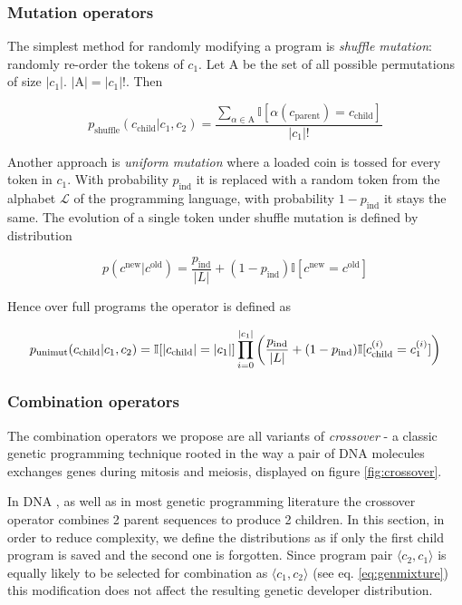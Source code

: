 \subsubsection{Mutation operators}

The simplest method for randomly modifying a program is \emph{shuffle mutation}: randomly re-order the tokens of $c_1$.
Let $\mathrm{A}$ be the set of all possible permutations of size $|c_1|$. $|\mathrm{A}|=|c_1|!$. 
Then

\begin{equation}
    p_\text{shuffle}(c_\text{child}|c_1,c_2) =
            \frac{\sum\limits_{\alpha \in \mathrm{A}} \mathbb{I}[\alpha(c_\text{parent}) = c_\text{child}]}{|c_1|!}
\end{equation}

Another approach is \emph{uniform mutation} where a loaded coin is tossed for every token in $c_1$. 
With probability $p_\text{ind}$ it is replaced with a random token from the alphabet $\mathcal{L}$ of the programming language, with probability $1-p_\text{ind}$ it stays the same.
The evolution of a single token under shuffle mutation is defined by distribution

\begin{equation}
    p(c^\text{new} | c^\text{old}) = \frac{p_\text{ind}}{|L|} +  (1 - p_\text{ind}) \mathbb{I}[c^\text{new} = c^\text{old}]
\end{equation}

Hence over full programs the operator is defined as

\begin{equation}
    p_\text{unimut}(c_\text{child}|c_1,c_2) = \mathbb{I}[|c_\text{child}|=|c_1|] \\ 
    \prod\limits_{i=0}^{|c_1|}  \left(\frac{p_\text{ind}}{|L|} +  (1 - p_\text{ind}) \mathbb{I}[c_\text{child}^{(i)} = c_1^{(i)}] \right)
\end{equation}

\subsubsection{Combination operators}

The combination operators we propose are all variants of \emph{crossover} - a classic genetic programming technique rooted in the way a pair of DNA molecules exchanges genes during mitosis and meiosis, displayed on figure \ref{fig:crossover}.

In DNA \cite{evocritique}, as well as in most genetic programming literature \cite{genprog,genprogast} the crossover operator combines 2 parent sequences to produce 2 children.
In this section, in order to reduce complexity, we define the distributions as if only the first child program is saved and the second one is forgotten.
Since program pair $\langle c_2, c_1 \rangle$ is equally likely to be selected for combination as $\langle c_1, c_2 \rangle$ (see eq. \ref{eq:genmixture}) this modification does not affect the resulting genetic developer distribution.


